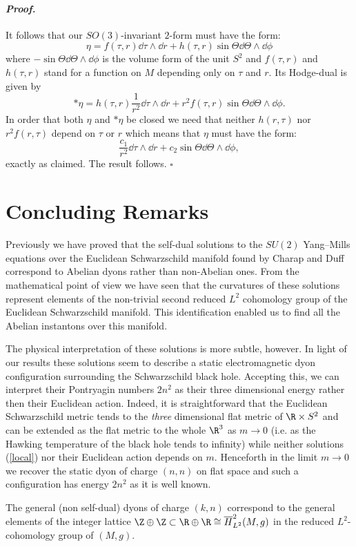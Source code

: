 \documentclass[a4paper,12pt,draft]{article}
\newenvironment{proof}{\paragraph{\it Proof.}}{$\square$\vskip0.4cm}
\begin{document}
\begin{proof}
It follows that our $SO(3)$-invariant $2$-form must have the form:
$$\eta=f(\tau ,r)\dd\tau\wedge \dd r + h(\tau
,r)\sin\Theta\dd\Theta\wedge\dd\phi$$ where 
$-\sin\Theta\dd\Theta\wedge \dd\phi$ is the volume form  of the
unit $S^2$ and $f(\tau ,r)$ and $h(\tau ,r)$ stand for a 
function on $M$ depending  only on $\tau$ and $r$. Its Hodge-dual is
given by $$*\eta = h(\tau ,r)\frac{1}{r^2}\dd\tau\wedge\dd r
+r^2f(\tau , r)\sin\Theta\dd\Theta\wedge\dd\phi .$$
In order that both $\eta$ and $*\eta$ be closed we need that neither 
$h(r, \tau )$ nor $r^2f(r, \tau )$ depend on $\tau$ or $r$ which means
that $\eta$ must have the form: 
$$\frac{c_1}{r^2}\dd\tau\wedge\dd r+ c_2\sin\Theta\dd\Theta\wedge\dd\phi
,$$ exactly as claimed. The result follows. 
\end{proof}


\section{Concluding Remarks}



Previously we have proved that the self-dual solutions to the $SU(2)$
Yang--Mills equations over the Euclidean Schwarzschild manifold found by
Charap and Duff correspond to Abelian dyons rather than non-Abelian ones.
From the mathematical point of view we have seen that the curvatures of
these solutions represent elements of the non-trivial second reduced $L^2$
cohomology group of the Euclidean Schwarzschild manifold. This
identification enabled us to find all the Abelian instantons over this
manifold.

The physical interpretation of these solutions is more subtle, however. In
light of our results these solutions seem to describe a static  
electromagnetic dyon configuration surrounding the Schwarzschild black
hole. Accepting this, we can interpret their Pontryagin numbers $2n^2$ as
their three dimensional energy rather then their Euclidean action. Indeed,
it is straightforward that the Euclidean Schwarzschild metric tends to the
{\it three} dimensional flat metric of $\R\times S^2$ and can be
extended as the flat metric to the whole $\R^3$ as $m\rightarrow 0$
(i.e. as the Hawking temperature of the black hole tends to infinity)
while neither solutions (\ref{local}) nor their Euclidean action 
depends on $m$. Henceforth in the limit $m\rightarrow 0$ we recover the
static dyon of charge $(n,n)$ on flat space and such a configuration has
energy $2n^2$ as it is well known. 

The general (non self-dual) dyons of charge $(k, n)$ correspond to the
general elements of the integer lattice
$\Z\oplus\Z\subset\R\oplus\R\cong\overline{H}^2_{L^2}(M,g)$ in the reduced
$L^2$-cohomology group of $(M, g)$. 
\end{document}
